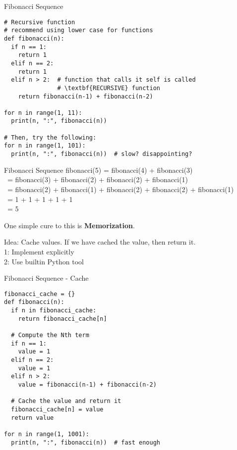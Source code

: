 \documentclass{beamer}
\begin{document}
\begin{frame}[fragile]{Fibonacci Sequence}
\begin{verbatim}
# Recursive function
# recommend using lower case for functions
def fibonacci(n):
  if n == 1:
    return 1
  elif n == 2:
    return 1
  elif n > 2:  # function that calls it self is called
               # \textbf{RECURSIVE} function
    return fibonacci(n-1) + fibonacci(n-2)

for n in range(1, 11):
  print(n, ":", fibonacci(n))

# Then, try the following:
for n in range(1, 101):
  print(n, ":", fibonacci(n))  # slow? disappointing?
\end{verbatim}
\end{frame}

\begin{frame}[fragile]{Fibonacci Sequence}
fibonacci(5) = fibonacci(4) + fibonacci(3) \\
\ = fibonacci(3) + fibonacci(2) + fibonacci(2) + fibonacci(1) \\
{\small 
\ = fibonacci(2) + fibonacci(1) + fibonacci(2) + fibonacci(2) + fibonacci(1)} \\
\ = 1 + 1 + 1 + 1 + 1 \\
\ = 5 \par \vspace{1em}
One simple cure to this is \textbf{Memorization}. \par
Idea: Cache values. If we have cached the value, then return it. \\
1: Implement explicitly \\
2: Use builtin Python tool
\end{frame}

\begin{frame}[fragile]{Fibonacci Sequence - Cache}
\begin{verbatim}
fibonacci_cache = {}
def fibonacci(n):
  if n in fibonacci_cache:
    return fibonacci_cache[n]
  
  # Compute the Nth term
  if n == 1:
    value = 1
  elif n == 2:
    value = 1
  elif n > 2:
    value = fibonacci(n-1) + fibonacci(n-2)
  
  # Cache the value and return it
  fibonacci_cache[n] = value
  return value

for n in range(1, 1001):
  print(n, ":", fibonacci(n))  # fast enough
\end{verbatim}
\end{frame}
\end{document}

